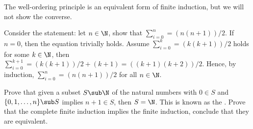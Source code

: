 \documentclass[10pt]{article}
\begin{document}
\par
The well-ordering principle is an equivalent form of finite induction, but we will not show the converse.
\begin{example}
    Consider the statement: let $n\in\N$, show that ${\sum}_{i=0}^{n}=(n(n+1))/2$. If $n=0$, then the equation trivially holds. Assume ${\sum}_{i=0}^{k}=(k(k+1))/2$ holds for some $k\in\N$, then ${\sum}_{i=0}^{k+1}=(k(k+1))/2+(k+1)=((k+1)(k+2))/2$. Hence, by induction, ${\sum}_{i=0}^{n}=(n(n+1))/2$ for all $n\in\N$.
\end{example}
\begin{problem}
    Prove that given a subset $S\sub\N$ of the natural numbers with $0\in S$ and $\{0,1,\dots,n\}\sub S$ implies $n+1\in S$, then $S=\N$. This is known as the . Prove that the complete finite induction implies the finite induction, conclude that they are equivalent.
\end{problem}
\end{document}
